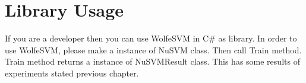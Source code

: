 \documentclass[11pt,a4paper]{article}
\begin{document}
%
%

\section{Library Usage}
If you are a developer then you can use WolfeSVM in C\# as library.
In order to use WolfeSVM,
please make a instance of NuSVM class.
Then call Train method.
Train method returns a instance of NuSVMResult class.
This has some results of experiments stated previous chapter.

%
%

\vskip 0.2in

\end{document}
